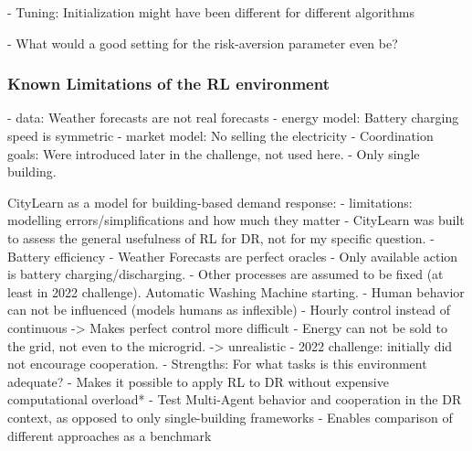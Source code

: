- Tuning: Initialization might have been different for different algorithms

- What would a good setting for the risk-aversion parameter even be?

\subsubsection{Known Limitations of the RL environment} %
- data: Weather forecasts are not real forecasts
- energy model: Battery charging speed is symmetric
- market model: No selling the electricity
- Coordination goals: Were introduced later in the challenge, not used here.
    - Only single building.

CityLearn as a model for building-based demand response:
- limitations: modelling errors/simplifications and how much they matter
    - CityLearn was built to assess the general usefulness of RL for DR, not for my specific question.
    - Battery efficiency
    - Weather Forecasts are perfect oracles
    - Only available action is battery charging/discharging.
    - Other processes are assumed to be fixed (at least in 2022 challenge). Automatic Washing Machine starting.
    - Human behavior can not be influenced (models humans as inflexible)
    - Hourly control instead of continuous -> Makes perfect control more difficult
    - Energy can not be sold to the grid, not even to the microgrid. -> unrealistic
    - 2022 challenge: initially did not encourage cooperation.
- Strengths: For what tasks is this environment adequate?
    - Makes it possible to apply RL to DR without expensive computational overload*
    - Test Multi-Agent behavior and cooperation in the DR context, as opposed to only single-building frameworks
    - Enables comparison of different approaches as a benchmark